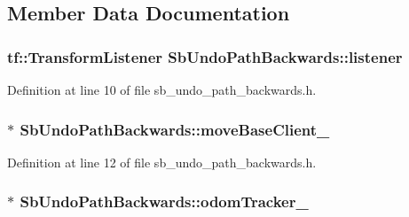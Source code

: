 \subsection{Member Data Documentation}
\subsubsection[{\texorpdfstring{listener}{listener}}]{\setlength{\rightskip}{0pt plus 5cm}tf\+::\+Transform\+Listener Sb\+Undo\+Path\+Backwards\+::listener\hspace{0.3cm}{\ttfamily [private]}}\hypertarget{classSbUndoPathBackwards_ad341922358ca111e8bea86a2f94a1f5c}{}\label{classSbUndoPathBackwards_ad341922358ca111e8bea86a2f94a1f5c}


Definition at line 10 of file sb\+\_\+undo\+\_\+path\+\_\+backwards.\+h.

\subsubsection[{\texorpdfstring{move\+Base\+Client\+\_\+}{moveBaseClient_}}]{$\ast$ Sb\+Undo\+Path\+Backwards\+::move\+Base\+Client\+\_\+\hspace{0.3cm}{\ttfamily [private]}}\hypertarget{classSbUndoPathBackwards_ad201bd8837a54bd7df0efc8d72fdb151}{}\label{classSbUndoPathBackwards_ad201bd8837a54bd7df0efc8d72fdb151}


Definition at line 12 of file sb\+\_\+undo\+\_\+path\+\_\+backwards.\+h.

\subsubsection[{\texorpdfstring{odom\+Tracker\+\_\+}{odomTracker_}}]{$\ast$ Sb\+Undo\+Path\+Backwards\+::odom\+Tracker\+\_\+\hspace{0.3cm}{\ttfamily [private]}}\hypertarget{classSbUndoPathBackwards_a4e543595d070980fb5cb621232904048}{}\label{classSbUndoPathBackwards_a4e543595d070980fb5cb621232904048}



